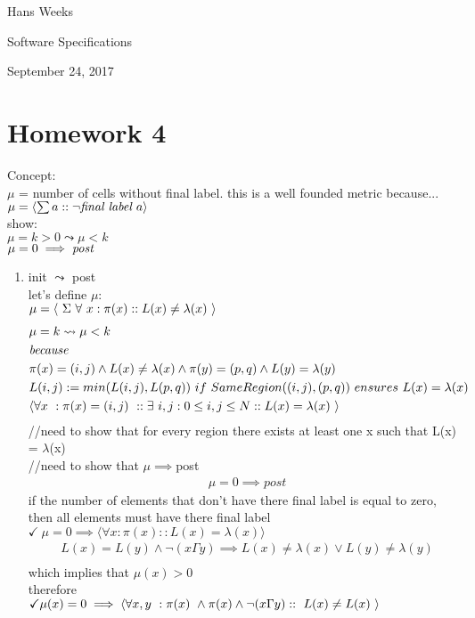 \documentclass{article}
\begin{document}
\hfill Hans Weeks

\hfill Software Specifications

\hfill September 24, 2017
\section*{Homework 4}
Concept:\\ $\mu$ = number of cells without final label. this is a well founded metric because...\\
$\mu = \langle \sum a :: \neg \emph{final label } a \rangle$\\
show:\\
$\mu=k>0 \leadsto \mu<k$\\
$\mu=0\implies \emph{post}$\\
\begin{enumerate}


\item
init $\leadsto$ post\\
let's define $\mu$:\\
$\mu = \langle \ \Sigma \ \forall \ x : \pi(x) :: L(x) \neq \lambda(x) \ \rangle\\$
\begin{align*}
&\mu = k \leadsto \mu < k\\
&\emph{because}\\
&\pi(x)=(i,j) \wedge L(x)\neq \lambda(x) \wedge \pi(y)=(p,q) \wedge L(y)=\lambda(y)\\
&L(i,j) := min(L(i,j),L(p,q)) \ if \ SameRegion((i,j),(p,q)) \ ensures \ L(x)=\lambda(x)\\
&\langle \forall x \ : \pi(x)=(i,j) \ :: \exists \ i,j : 0 \leq i,j \leq N :: L(x)=\lambda(x) \ \rangle\\
\end{align*}
//need to show that for every region there exists at least one x such that L(x) = $\lambda$(x)\\
//need to show that $\mu\implies$post
\begin{align*}
&\mu = 0 \implies post
\end{align*}
if the number of elements that don't have there final label is equal to zero, then all elements must have there final label\\
$\checkmark \ \mu = 0 \implies \langle \forall x : \pi(x) :: L(x)=\lambda(x) \rangle$\\

\begin{align*}
&L(x) = L(y) \wedge \neg(x \Gamma y) \implies L(x)\neq\lambda(x) \vee L(y)\neq \lambda(y)\\
\end{align*}
which implies that
$\mu(x) > 0$\\
therefore\\
$\checkmark \mu(x)=0 \implies  \langle \forall x,y \ : \pi(x) \ \wedge \pi(x) \wedge \neg(x \Gamma y) :: \ L(x) \neq L(x)  \ \rangle\\$



\end{enumerate}
\end{document}
